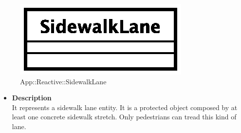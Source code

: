 \begin{figure}[h]
\centering
\includegraphics[scale=0.6,keepaspectratio]{images/solution/sidewalk_lane.eps}
\caption{App::Reactive::SidewalkLane}
\label{fig:sd-app-sidewalk_lane}
\end{figure}
\FloatBarrier
\begin{itemize}
  \item \textbf{Description} \\
    It represents a sidewalk lane entity. It is a protected object composed by at least
one concrete sidewalk stretch. Only pedestrians can tread this kind of lane. 
\end{itemize}
